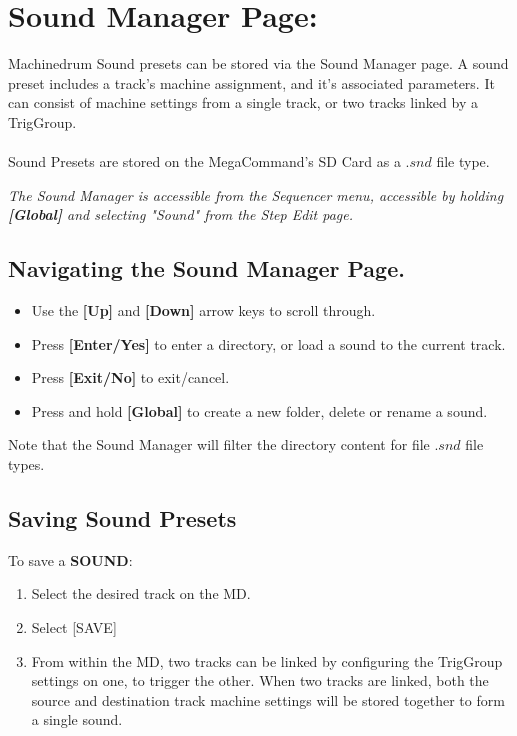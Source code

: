 \chapter{Sound Manager Page:}
Machinedrum Sound presets can be stored via the Sound Manager page.  A sound preset includes a track's machine assignment, and it's associated parameters. It can consist of machine settings from a single track, or two tracks linked by a TrigGroup.\\
\\
Sound Presets are stored on the MegaCommand's SD Card as a $.snd$ file type.

\textit{The Sound Manager is accessible from the Sequencer menu, accessible by holding \textbf{[Global]} and selecting "Sound" from the Step Edit page.}

\section{Navigating the Sound Manager Page.}
\begin{itemize}
    \item Use the \textbf{[Up]} and \textbf{[Down]} arrow keys to scroll through.
    \item Press \textbf{[Enter/Yes]} to enter a directory, or load a sound to the current track.
    \item Press \textbf{[Exit/No]} to exit/cancel.
    \item Press and hold \textbf{[Global]} to create a new folder, delete or rename a sound.
\end{itemize}

Note that the Sound Manager will filter the directory content for file $.snd$ file types.
\newpage
\section{Saving Sound Presets}
To save a \textbf{SOUND}:
\begin{enumerate}
 \item Select the desired track on the MD.
 \item Select [SAVE]
 \item From within the MD, two tracks can be linked by configuring the TrigGroup settings on one, to trigger the other. When two tracks are linked, both the source and destination track machine settings will be stored together to form a single sound.
\end{enumerate}
